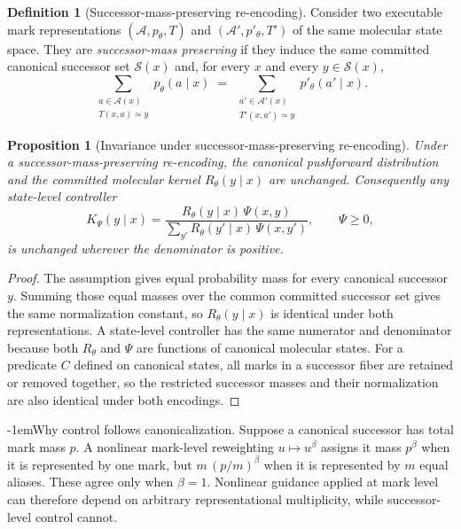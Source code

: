 \documentclass{article}
\makeatletter
\newtheorem{proposition}[theorem]{Proposition}
\theoremstyle{definition}
\newtheorem{definition}[theorem]{Definition}
\theoremstyle{remark}
\def\paragraph{\@startsection{paragraph}{4}{\z@}{1.0ex plus 0.3ex minus .2ex}%
  {-1em}{\normalsize\bf}}
\newcommand{\A}{\mathcal{A}}
\newcommand{\Sset}{\mathcal{S}}
\makeatother
\begin{document}
\begin{definition}[Successor-mass-preserving re-encoding]
Consider two executable mark representations $(\A,p_\theta,T)$ and
$(\A',p'_\theta,T')$ of the same molecular state space. They are
\emph{successor-mass preserving} if they induce the same committed canonical
successor set $\Sset(x)$ and, for every $x$ and every $y\in\Sset(x)$,
\[
  \sum_{\substack{a\in\A(x)\\ T(x,a)\simeq y}} p_\theta(a\mid x)
  \;=\;
  \sum_{\substack{a'\in\A'(x)\\ T'(x,a')\simeq y}} p'_\theta(a'\mid x).
\]
\end{definition}

\begin{proposition}[Invariance under successor-mass-preserving re-encoding]
\label{prop:canon-invariance}
Under a successor-mass-preserving re-encoding, the canonical pushforward
distribution and the committed molecular kernel $R_\theta(y\mid x)$ are
unchanged. Consequently any state-level controller
\[
  K_\Psi(y\mid x)
  =\frac{R_\theta(y\mid x)\,\Psi(x,y)}
        {\sum_{y'} R_\theta(y'\mid x)\,\Psi(x,y')},
  \qquad \Psi\ge 0,
\]
is unchanged wherever the denominator is positive.
\end{proposition}

\begin{proof}
The assumption gives equal probability mass for every canonical successor $y$.
Summing those equal masses over the common committed successor set gives the same
normalization constant, so $R_\theta(y\mid x)$ is identical under both
representations. A state-level controller has the same numerator and denominator
because both $R_\theta$ and $\Psi$ are functions of canonical molecular states.
For a predicate $C$ defined on canonical states, all marks in a successor fiber
are retained or removed together, so the restricted successor masses and their
normalization are also identical under both encodings.
\end{proof}

\paragraph{Why control follows canonicalization.} Suppose a canonical successor
has total mark mass $p$. A nonlinear mark-level reweighting $u\mapsto u^{\beta}$
assigns it mass $p^{\beta}$ when it is represented by one mark, but
$m\,(p/m)^{\beta}$ when it is represented by $m$ equal aliases. These agree only
when $\beta=1$. Nonlinear guidance applied at mark level can therefore depend on
arbitrary representational multiplicity, while successor-level control cannot.
\end{document}
